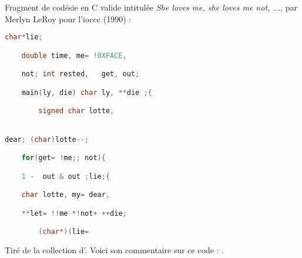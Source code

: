 \documentclass[12pt]{article} %
\begin{document}
Fragment de codésie en C valide intitulée \textit{She loves me, she loves me not, ...}, par  Merlyn LeRoy pour l'\acrshort{ioccc} (1990) :
\begin{lstlisting}[language=C, caption={Charlie and Charlotte}, label={codework:charlie-charlotte}]
    char*lie;

	double time, me= !0XFACE,

	not; int rested,   get, out;

	main(ly, die) char ly, **die ;{

	    signed char lotte,


dear; (char)lotte--;

	for(get= !me;; not){

	1 -  out & out ;lie;{

	char lotte, my= dear,

	**let= !!me *!not+ ++die;

	    (char*)(lie=
\end{lstlisting}
Tiré de la collection d'\citeauthor{MEnriqueBermudez-ObfuscatedCCode}. Voici son commentaire sur ce code :  \cite{MEnriqueBermudez-ObfuscatedCCode}.




\newpage
\printglossary[type=\acronymtype, title=Acronymes]

\printglossary[title=Glossaire]

\newpage
\printbibliography[
    heading=bibintoc,
    category=cited,
    title={Références}
]

\printbibliography[
    notcategory=cited,
    heading=bibintoc,
    title={Bibliographie complémentaire},
]


\restoregeometry
\end{document}
